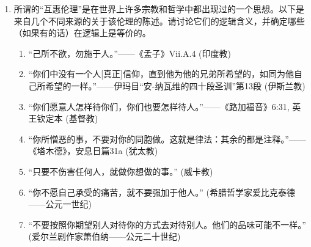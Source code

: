 \begin{enumerate}
\begin{enumerate}
  “如果一个物质闪闪发光，它不一定是金子。”
  \item 
  
  “有烟必有火。”
  \item 
  
  “如果一个数被平方，结果是正数。”
  \item 
  
  “如果一个矩阵是方阵，那么它是可逆的。”
  \end{enumerate}
  
  \wbvfill
  
  
  \hintspagebreak
  \workbookpagebreak
  
  \item 
  所谓的“互惠伦理”是在世界上许多宗教和哲学中都出现过的一个思想。以下是来自几个不同来源的关于该伦理的陈述。请讨论它们的逻辑含义，并确定哪些（如果有的话）在逻辑上是等价的。
  \begin{enumerate}
  \item 
  “己所不欲，勿施于人。”——《孟子》Vii.A.4 (印度教)
  \item 
  “你们中没有一个人[真正]信仰，直到他为他的兄弟所希望的，如同为他自己所希望的一样。”——伊玛目“安-纳瓦维的四十段圣训”第13段 (伊斯兰教)
  \item 
  “你们愿意人怎样待你们，你们也要怎样待人。”——《路加福音》6:31, 英王钦定本 (基督教)
  \item 
  
  “你所憎恶的事，不要对你的同胞做。这就是律法：其余的都是注释。”——《塔木德》，安息日篇31a (犹太教)
  \item 
  “只要不伤害任何人，就做你想做的事。” (威卡教)
  \item 
  “你不愿自己承受的痛苦，就不要强加于他人。” (希腊哲学家爱比克泰德——公元一世纪)
  \item 
  “不要按照你期望别人对待你的方式去对待别人。他们的品味可能不一样。” (爱尔兰剧作家萧伯纳——公元二十世纪)
  \end{enumerate}
  

\end{enumerate}
